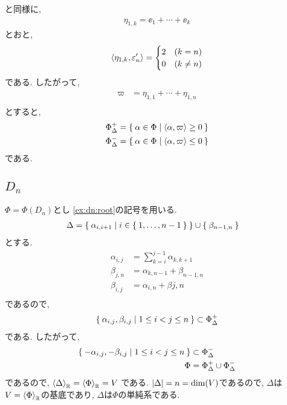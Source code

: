 と同様に,
\begin{align*}
  \eta_{1,k}=\ee_1+\cdots+\ee_k
\end{align*}
とおと,
\begin{align*}
  \Braket{\eta_{1,k},\varepsilon'_{n}}=
  \begin{cases}
    2 &(k=n)\\
    0 &(k\neq n)
  \end{cases}
\end{align*}
である.
したがって,
\begin{align*}
  \varpi&=\eta_{1,1}+\cdots+\eta_{1,n}\\
\end{align*}
  とすると,
\begin{align*}
\Phi_\Delta^+&=\Set{\alpha\in\Phi|\Braket{\alpha,\varpi}\geq 0}\\
\Phi_\Delta^-&=\Set{\alpha\in\Phi|\Braket{\alpha,\varpi}\leq 0}
\end{align*}
である.


\subsection{$D_{n}$}
\label{ex:dn:simple}
$\Phi=\Phi(D_n)$とし
\cref{ex:dn:root}の記号を用いる.
\begin{align*}
  \Delta&=\Set{\alpha_{i,i+1}|i\in\Set{1,\ldots,n-1}}\cup \Set{\beta_{n-1,n}}
\end{align*}
とする.
\begin{align*}
\alpha_{i,j}&=\sum_{k=i}^{j-1}\alpha_{k,k+1}\\
\beta_{j,n}&=\alpha_{k,n-1}+\beta_{n-1,n}\\
\beta_{i,j}&=\alpha_{i,n}+\beta{j,n}\\
\end{align*}
であるので, 
\begin{align*}
  \Set{\alpha_{i,j},\beta_{i,j}|1\leq i<j\leq n}\subset\Phi_\Delta^+
\end{align*}
である. したがって,
\begin{align*}
  \Set{-\alpha_{i,j},-\beta_{i,j}|1\leq i<j\leq n}&\subset\Phi_\Delta^-\\
  \Phi&=\Phi_\Delta^+\cup\Phi_\Delta^-
\end{align*}
であるので,
$\Braket{\Delta}_{\mathbb{R}}=\Braket{\Phi}_{\mathbb{R}}=V$
である.
$\left|\Delta\right|=n=\dim(V)$であるので, $\Delta$は$V=\Braket{\Phi}_{\mathbb{R}}$の基底であり,
$\Delta$は$\Phi$の単純系である.


